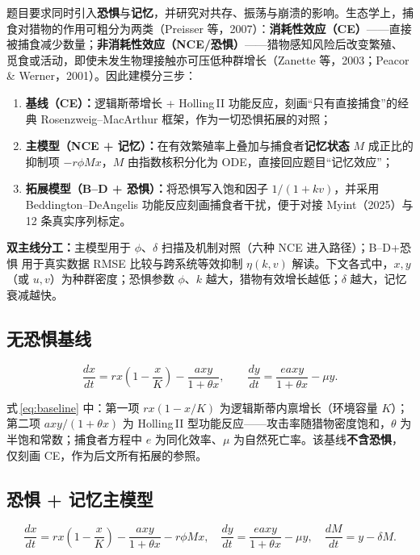 \documentclass[12pt,a4paper]{ctexart}
\begin{document}
题目要求同时引入\textbf{恐惧}与\textbf{记忆}，并研究对共存、振荡与崩溃的影响。生态学上，捕食对猎物的作用可粗分为两类（Preisser 等，2007）：\textbf{消耗性效应（CE）}——直接被捕食减少数量；\textbf{非消耗性效应（NCE/恐惧）}——猎物感知风险后改变繁殖、觅食或活动，即使未发生物理接触亦可压低种群增长（Zanette 等，2003；Peacor \& Werner，2001）。因此建模分三步：

\begin{enumerate}[label=\arabic*.,leftmargin=2em]
  \item \textbf{基线（CE）：}逻辑斯蒂增长 + Holling\,II 功能反应，刻画“只有直接捕食”的经典 Rosenzweig--MacArthur 框架，作为一切恐惧拓展的对照；
  \item \textbf{主模型（NCE + 记忆）：}在有效繁殖率上叠加与捕食者\textbf{记忆状态} $M$ 成正比的抑制项 $-r\phi Mx$，$M$ 由指数核积分化为 ODE，直接回应题目“记忆效应”；
  \item \textbf{拓展模型（B--D + 恐惧）：}将恐惧写入饱和因子 $1/(1+kv)$，并采用 Beddington--DeAngelis 功能反应刻画捕食者干扰，便于对接 Myint（2025）与 12 条真实序列标定。
\end{enumerate}

\textbf{双主线分工：}主模型用于 $\phi$、$\delta$ 扫描及机制对照（六种 NCE 进入路径）；B--D+恐惧 用于真实数据 RMSE 比较与跨系统等效抑制 $\eta(k,v)$ 解读。下文各式中，$x,y$（或 $u,v$）为种群密度；恐惧参数 $\phi$、$k$ 越大，猎物有效增长越低；$\delta$ 越大，记忆衰减越快。

\subsection{无恐惧基线}

\begin{equation}
  \frac{dx}{dt} = rx\left(1-\frac{x}{K}\right) - \frac{axy}{1+\theta x}, \qquad
  \frac{dy}{dt} = \frac{eaxy}{1+\theta x} - \mu y.
  \label{eq:baseline}
\end{equation}

式\,\eqref{eq:baseline} 中：第一项 $rx(1-x/K)$ 为逻辑斯蒂内禀增长（环境容量 $K$）；第二项 $axy/(1+\theta x)$ 为 Holling\,II 型功能反应——攻击率随猎物密度饱和，$\theta$ 为半饱和常数；捕食者方程中 $e$ 为同化效率、$\mu$ 为自然死亡率。该基线\textbf{不含恐惧}，仅刻画 CE，作为后文所有拓展的参照。

\subsection{恐惧 + 记忆主模型}

\begin{equation}
  \frac{dx}{dt} = rx\left(1-\frac{x}{K}\right) - \frac{axy}{1+\theta x} - r\phi M x,\quad
  \frac{dy}{dt} = \frac{eaxy}{1+\theta x} - \mu y,\quad
  \frac{dM}{dt} = y - \delta M.
  \label{eq:main}
\end{equation}
\end{document}
